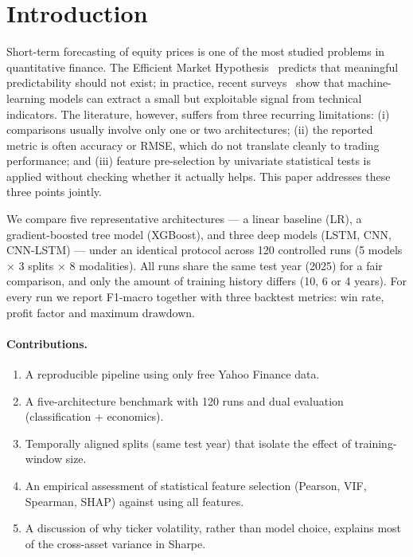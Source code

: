 \documentclass[runningheads]{llncs}
\begin{document}
\section{Introduction}

Short-term forecasting of equity prices is one of the most studied problems in quantitative finance. The Efficient Market Hypothesis~\cite{fama1970} predicts that meaningful predictability should not exist; in practice, recent surveys~\cite{sezer2020,jiang2021} show that machine-learning models can extract a small but exploitable signal from technical indicators. The literature, however, suffers from three recurring limitations: (i) comparisons usually involve only one or two architectures; (ii) the reported metric is often accuracy or RMSE, which do not translate cleanly to trading performance; and (iii) feature pre-selection by univariate statistical tests is applied without checking whether it actually helps. This paper addresses these three points jointly.

We compare five representative architectures --- a linear baseline (LR), a gradient-boosted tree model (XGBoost), and three deep models (LSTM, CNN, CNN-LSTM) --- under an identical protocol across 120 controlled runs (5 models $\times$ 3 splits $\times$ 8 modalities). All runs share the same test year (2025) for a fair comparison, and only the amount of training history differs (10, 6 or 4 years). For every run we report F1-macro together with three backtest metrics: win rate, profit factor and maximum drawdown.

\paragraph{Contributions.}
\begin{enumerate}
\item A reproducible pipeline using only free Yahoo Finance data.
\item A five-architecture benchmark with 120 runs and dual evaluation (classification + economics).
\item Temporally aligned splits (same test year) that isolate the effect of training-window size.
\item An empirical assessment of statistical feature selection (Pearson, VIF, Spearman, SHAP) against using all features.
\item A discussion of why ticker volatility, rather than model choice, explains most of the cross-asset variance in Sharpe.
\end{enumerate}
\end{document}
